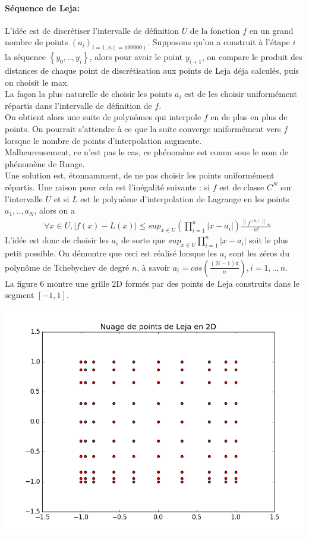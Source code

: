 \paragraph{Séquence de Leja:}
L'idée est de discrétiser l'intervalle de définition $U$ de la fonction $f$ en un grand nombre de points $(a_i)_{i=1..n(=100000)}$.
Supposons qu'on a construit à l'étape $i$ la séquence $\left \{ y_0,..,y_i \right \}$, alors pour avoir le point $y_{i+1}$,
on compare le produit des distances de chaque point de discrétisation aux points de Leja déja calculés, puis on choisit le max.\\
La façon la plus naturelle de choisir les points $a_i$ est de les choisir uniformément répartis dans l'intervalle de définition de $f$.\\
On obtient alors une suite de polynômes qui interpole $f$ en de plus en plus de points. On pourrait s'attendre à ce que la suite converge
uniformément vers $f$ lorsque le nombre de points d'interpolation augmente.\\
Malheureusement, ce n'est pas le cas, ce phénomène est connu sous le nom de phénomène de Runge. \\
Une solution est, étonnamment, de ne pas choisir les points uniformément répartis. Une raison pour cela est l'inégalité suivante :
si $f$ est de classe $C^N$ sur l'intervalle $U$ et si $L$ est le polynôme d'interpolation de Lagrange en les points $a_1,..,a_N$, alors on a
\begin{align}
		& \forall x \in U, \left |f(x)-L(x)\right | \leq sup_{x \in U}  (\prod_{i=1}^n \left | x-a_i \right |) \frac{\left \|f^{(n)} \right \|_{\infty}}{n!}
\end{align}
\hspace{0.5cm}
L'idée est donc de choisir les $a_i$ de sorte que $sup_{x \in U}  \prod_{i=1}^n \left | x-a_i \right |$ soit le plus petit possible. On démontre que
ceci est réalisé lorsque les $a_i$ sont les zéros du polynôme de Tchebychev de degré $n$, à savoir $a_i = cos(\frac{(2i-1) \pi}{n}), i =1,..,n$.\\
La figure 6 montre une grille 2D formés par des points de Leja construits dans le segment $\left [-1,1 \right ]$.\\
\begin{center}
\includegraphics[height= 9 cm,width = \linewidth]{images/leja_sequence.png}
\end{center}


